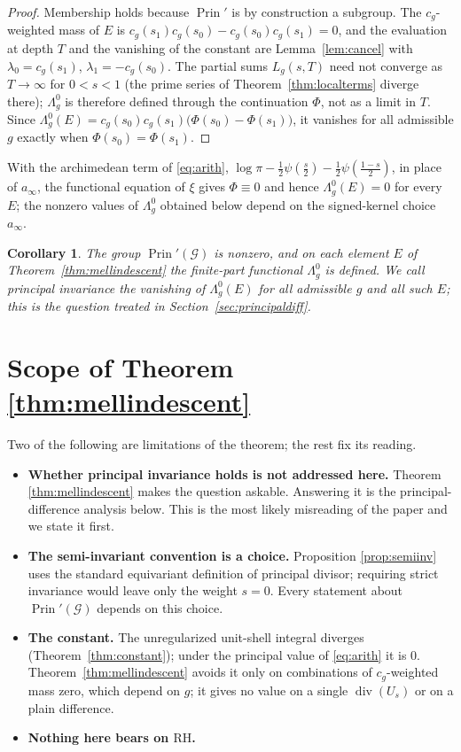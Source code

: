 \documentclass[11pt]{amsart}
\newtheorem{corollary}[theorem]{Corollary}
\theoremstyle{definition}
\theoremstyle{remark}
\newcommand{\RH}{\mathrm{RH}}
\newcommand{\divv}{\operatorname{div}}
\newcommand{\Prin}{\operatorname{Prin}}
\newcommand{\Gr}{\mathcal G}
\begin{document}
\begin{proof}
Membership holds because $\Prin'$ is by construction a subgroup.  The
$c_g$-weighted mass of $E$ is $c_g(s_1)c_g(s_0)-c_g(s_0)c_g(s_1)=0$, and
the evaluation at depth $T$ and the vanishing of the constant are
Lemma~\ref{lem:cancel} with $\lambda_0=c_g(s_1)$, $\lambda_1=-c_g(s_0)$.
The partial sums $L_g(s,T)$ need not converge as $T\to\infty$ for
$0<s<1$ (the prime series of Theorem~\ref{thm:localterms} diverge there);
$\Lambda_g^0$ is therefore defined through the continuation $\Phi$, not as
a limit in $T$.  Since
$\Lambda_g^0(E)=c_g(s_0)c_g(s_1)\big(\Phi(s_0)-\Phi(s_1)\big)$, it vanishes
for all admissible $g$ exactly when $\Phi(s_0)=\Phi(s_1)$.
\end{proof}

With the archimedean term of \eqref{eq:arith},
$\log\pi-\tfrac12\psi(\tfrac s2)-\tfrac12\psi(\tfrac{1-s}2)$, in place of
$a_\infty$, the functional equation of $\xi$ gives $\Phi\equiv0$ and hence
$\Lambda_g^0(E)=0$ for every $E$; the nonzero values of $\Lambda_g^0$
obtained below depend on the signed-kernel choice $a_\infty$.

\begin{corollary}
The group $\Prin'(\Gr)$ is nonzero, and on each element $E$ of
Theorem~\ref{thm:mellindescent} the finite-part functional $\Lambda_g^0$ is
defined.  We call \emph{principal invariance} the vanishing of
$\Lambda_g^0(E)$ for all admissible $g$ and all such $E$; this is the
question treated in Section~\ref{sec:principaldiff}.
\end{corollary}

\section{Scope of Theorem \ref{thm:mellindescent}}

Two of the following are limitations of the theorem; the rest fix its
reading.

\begin{itemize}
\item \textbf{Whether principal invariance holds is not addressed here.}
Theorem \ref{thm:mellindescent} makes the question askable.  Answering it is
the principal-difference analysis below.  This is the most likely misreading of the paper and we state it
first.

\item \textbf{The semi-invariant convention is a choice.}  Proposition
\ref{prop:semiinv} uses the standard equivariant definition of principal
divisor; requiring strict invariance would leave only the weight $s=0$.
Every statement about $\Prin'(\Gr)$ depends on this choice.

\item \textbf{The constant.}  The unregularized unit-shell integral
diverges (Theorem~\ref{thm:constant}); under the principal value of
\eqref{eq:arith} it is $0$.  Theorem~\ref{thm:mellindescent} avoids it only
on combinations of $c_g$-weighted mass zero, which depend on $g$; it gives no
value on a single $\divv(U_s)$ or on a plain difference.

\item \textbf{Nothing here bears on $\RH$.}
\end{itemize}
\end{document}
